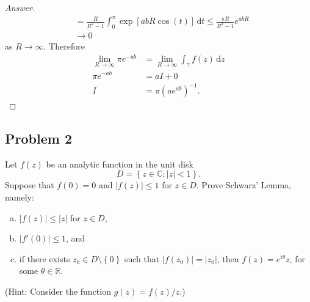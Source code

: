\documentclass[12pt]{article}
\newcommand{\cx}{\mathbb{C}}
\newcommand{\real}{\mathbb{R}}
\newcommand\inv[1]{#1^{-1}}
\newcommand\paren[1]{\left( #1 \right)}
\newcommand\setb[1]{\left \{ #1 \right \}}
\newcommand{\sqbrack}[1]{\left [ #1 \right ]}
\newcommand{\abs}[1]{\left| #1 \right|}
\theoremstyle{definition}
\begin{document}
\begin{proof}[Answer]
\begin{align*}
        & = \frac{R}{R^2 - 1} \int_0^{\pi} \exp \sqbrack{ abR \cos(t) } \, \mathrm{d}t \leq \frac{\pi R}{R^2 - 1} e^{abR} \\
        & \to 0
    \end{align*}
    as $R \to \infty$. Therefore
    \begin{align*}
        \lim\limits_{R \to \infty} \pi e^{-ab} & = \lim\limits_{R \to \infty} \int_{\gamma} f(z) \, \mathrm{d}z \\
        \pi e^{-ab} & = aI + 0 \\
        I & = \boxed{ \pi \inv{ \paren{ ae^{ab} } }. }
    \end{align*}
\end{proof}
\subsection{Problem 2 \texorpdfstring{\cite{Conway}}{}}
Let $f(z)$ be an analytic function in the unit disk
\[
    D = \setb{ z \in \cx : |z| < 1 }.
\]
Suppose that $f(0) = 0$ and $\abs{ f(z) } \leq 1$ for $z \in D$. Prove Schwarz' Lemma, namely:
\begin{enumerate}[(a)]
    \item $\abs{ f(z) } \leq \abs{ z }$ for $z \in D$, 
    \item $\abs{ f'(0) } \leq 1$, and
    \item if there exists $z_0 \in D \setminus \setb{ 0 }$ such that $\abs{ f \paren{ z_0 } } = \abs{ z_0 }$, then $f(z) = e^{i \theta} z$, for some $\theta \in \real$.
\end{enumerate}
(Hint: Consider the function $g(z) = f(z)/z$.)
\end{document}

